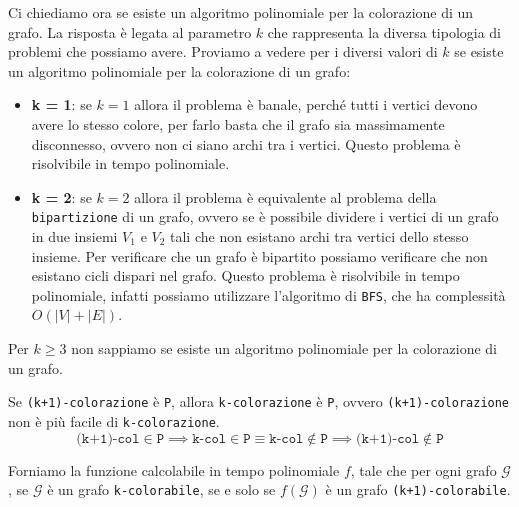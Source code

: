 Ci chiediamo ora se esiste un algoritmo polinomiale per la colorazione di un grafo.
La risposta è legata al parametro $k$ che rappresenta la diversa tipologia di 
problemi che possiamo avere. Proviamo a vedere per i diversi valori di $k$ se esiste
un algoritmo polinomiale per la colorazione di un grafo:
\begin{itemize}
    \item \textbf{k = 1}: se $k = 1$ allora il problema è banale, perché tutti i vertici
    devono avere lo stesso colore, per farlo basta che il grafo sia massimamente disconnesso,
    ovvero non ci siano archi tra i vertici. Questo problema è risolvibile in tempo polinomiale.
    \item \textbf{k = 2}: se $k = 2$ allora il problema è equivalente al problema della
    \texttt{bipartizione} di un grafo, ovvero se è possibile dividere i vertici di un grafo
    in due insiemi $V_1$ e $V_2$ tali che non esistano archi tra vertici dello stesso insieme.
    Per verificare che un grafo è bipartito possiamo verificare che non esistano cicli dispari
    nel grafo. Questo problema è risolvibile in tempo polinomiale, infatti possiamo utilizzare
    l'algoritmo di \texttt{BFS}, che ha complessità $O(|V| + |E|)$.
\end{itemize}
Per $k \geq 3$ non sappiamo se esiste un algoritmo polinomiale per la colorazione di un grafo.

\begin{tcolorbox}[title = {$\texttt{k-colorazione} \preceq_p \texttt{(k + 1)-colorazione}$}]
    Se \texttt{(k+1)-colorazione} è \texttt{P}, allora \texttt{k-colorazione} è \texttt{P},
    ovvero \texttt{(k+1)-colorazione} non è più facile di \texttt{k-colorazione}.
    \[
      \texttt{(k+1)-col} \in \texttt{P} \implies \texttt{k-col} \in \texttt{P} 
      \equiv \texttt{k-col} \not \in \texttt{P} \implies \texttt{(k+1)-col} \not \in \texttt{P}
    \]
\end{tcolorbox}
    Forniamo la funzione calcolabile in tempo polinomiale $f$, 
    tale che per ogni grafo $\mathcal{G}$, se $\mathcal{G}$ è un grafo \texttt{k-colorabile},
    se e solo se $f(\mathcal{G})$ è un grafo
    \texttt{(k+1)-colorabile}. 

